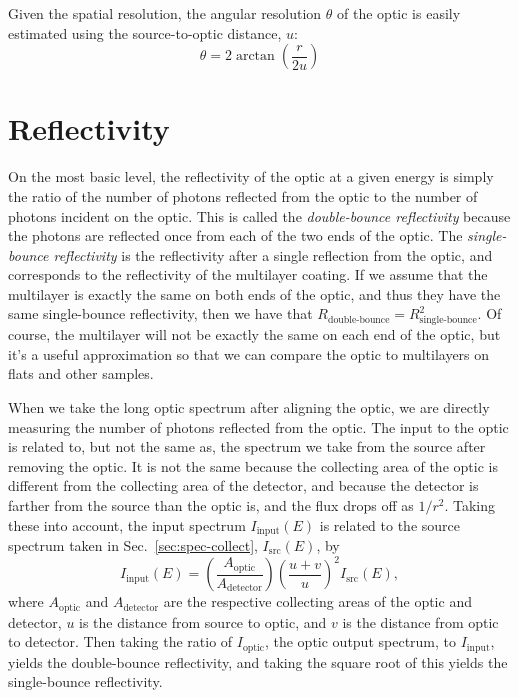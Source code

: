 Given the spatial resolution, the angular resolution $\theta$ of the optic is
easily estimated using the source-to-optic distance, $u$:
\begin{equation}
  \label{eq:ang_res}
  \theta = 2 \arctan{ \left( \frac{r}{2u} \right) }
\end{equation}

\section{Reflectivity}

On the most basic level, the reflectivity of the optic at a given energy is
simply the ratio of the number of photons reflected from the optic to the number
of photons incident on the optic. This is called the \textit{double-bounce
  reflectivity} because the photons are reflected once from each of the two ends
of the optic. The \textit{single-bounce reflectivity} is the reflectivity after
a single reflection from the optic, and corresponds to the reflectivity of the
multilayer coating. If we assume that the multilayer is exactly the same on both
ends of the optic, and thus they have the same single-bounce reflectivity, then
we have that $R_\text{double-bounce} = R_\text{single-bounce}^2$. Of course, the
multilayer will not be exactly the same on each end of the optic, but it's a
useful approximation so that we can compare the optic to multilayers on flats
and other samples.

When we take the long optic spectrum after aligning the optic, we are directly
measuring the number of photons reflected from the optic. The input to the optic
is related to, but not the same as, the spectrum we take from the source after
removing the optic. It is not the same because the collecting area of the optic
is different from the collecting area of the detector, and because the detector
is farther from the source than the optic is, and the flux drops off as
$1/r^2$. Taking these into account, the input spectrum $I_\text{input}(E)$ is
related to the source spectrum taken in Sec.~\ref{sec:spec-collect},
$I_\text{src}(E)$, by
\begin{equation}
  \label{eq:src-2-input}
  I_\text{input}(E) = \left( \frac{ A_\text{optic} }{ A_\text{detector} }
  \right) \left( \frac{ u+v }{ u } \right)^2 I_\text{src}(E),
\end{equation}
where $A_\text{optic}$ and $A_\text{detector}$ are the respective collecting
areas of the optic and detector, $u$ is the distance from source to optic, and
$v$ is the distance from optic to detector. Then taking the ratio of
$I_\text{optic}$, the optic output spectrum, to $I_\text{input}$, yields the
double-bounce reflectivity, and taking the square root of this yields the
single-bounce reflectivity.

